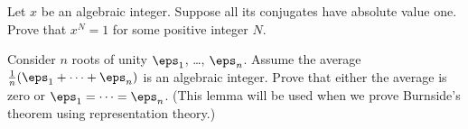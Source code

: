 \begin{problem} \yod
	Let $x$ be an algebraic integer.
	Suppose all its conjugates have absolute value one.
	Prove that $x^N=1$ for some positive integer $N$.
\end{problem}

\begin{problem}
	\label{prob:rep_lemma}
	Consider $n$ roots of unity $\eps_1$, \dots, $\eps_n$.
	Assume the average $\frac1n(\eps_1 + \dots + \eps_n)$ is an algebraic integer.
	Prove that either the average is zero or $\eps_1 = \dots = \eps_n$.
	(This lemma will be used when we prove Burnside's theorem using representation theory.)
\end{problem}
